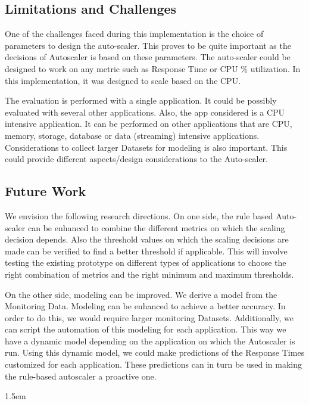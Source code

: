 \documentclass[article,type=msc,colorback,12pt,accentcolor=tud8b,table]{tudthesis}
\begin{document}
 \subsection{Limitations and Challenges}	
 
 One of the challenges faced during this implementation is the choice of parameters to design the auto-scaler. This proves to be quite important as the decisions of Autoscaler is based on these parameters. The auto-scaler could be designed to work on any metric such as Response Time or CPU \% utilization. In this implementation, it was designed to scale based on the CPU. 
 
 The evaluation is performed with a single application. It could be possibly evaluated with several other applications. Also, the app considered is a CPU intensive application. It can be performed on other applications that are CPU, memory, storage, database or data (streaming) intensive applications. Considerations to collect larger Datasets for modeling is also important. This could provide different aspects/design considerations to the Auto-scaler.
 
 
\subsection{Future Work}

We envision the following research directions. On one side, the rule based Auto-scaler can be enhanced to combine the different metrics on which the scaling decision depends. Also the threshold values on which the scaling decisions are made can be verified to find a better threshold if applicable. This will involve testing the existing prototype on different types of applications to choose the right combination of metrics and the right minimum and maximum thresholds. 

On the other side, modeling can be improved. We derive a model from the Monitoring Data. Modeling can be enhanced to achieve a better accuracy. In order to do this, we would require larger monitoring Datasets. Additionally, we can script the automation of this modeling for each application. This way we have a dynamic model depending on the application on which the Autoscaler is run. Using this dynamic model, we could make predictions of the Response Times customized for each application. These predictions can in turn be used in making the rule-based autoscaler a proactive one. 

\clearpage
 \hfill  

\emergencystretch 1.5em

	  

\clearpage

\printglossary
\clearpage
\end{document}
